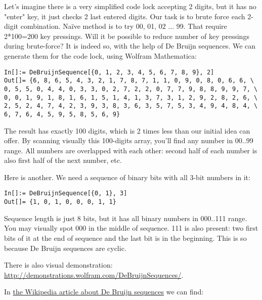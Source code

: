 
\leveldown{}


Let's imagine there is a very simplified code lock accepting 2 digits, but it has no "enter" key, it just checks 2 last entered digits.
Our task is to brute force each 2-digit combination.
Naïve method is to try 00, 01, 02 ... 99.
That require 2*100=200 key pressings.
Will it be possible to reduce number of key pressings during brute-force?
It is indeed so, with the help of De Bruijn sequences.
We can generate them for the code lock, using Wolfram Mathematica:

\begin{lstlisting}
In[]:= DeBruijnSequence[{0, 1, 2, 3, 4, 5, 6, 7, 8, 9}, 2]
Out[]= {6, 8, 6, 5, 4, 3, 2, 1, 7, 8, 7, 1, 1, 0, 9, 0, 8, 0, 6, 6, \
0, 5, 5, 0, 4, 4, 0, 3, 3, 0, 2, 7, 2, 2, 0, 7, 7, 9, 8, 8, 9, 9, 7, \
0, 0, 1, 9, 1, 8, 1, 6, 1, 5, 1, 4, 1, 3, 7, 3, 1, 2, 9, 2, 8, 2, 6, \
2, 5, 2, 4, 7, 4, 2, 3, 9, 3, 8, 3, 6, 3, 5, 7, 5, 3, 4, 9, 4, 8, 4, \
6, 7, 6, 4, 5, 9, 5, 8, 5, 6, 9}
\end{lstlisting}

The result has exactly 100 digits, which is 2 times less than our initial idea can offer.
By scanning visually this 100-digits array, you'll find any number in 00..99 range.
All numbers are overlapped with each other: second half of each number is also first half of the next number, etc.

Here is another. We need a sequence of binary bits with all 3-bit numbers in it:

\begin{lstlisting}
In[]:= DeBruijnSequence[{0, 1}, 3]
Out[]= {1, 0, 1, 0, 0, 0, 1, 1}
\end{lstlisting}

Sequence length is just 8 bits, but it has all binary numbers in 000..111 range.
You may visually spot 000 in the middle of sequence.
111 is also present: two first bits of it at the end of sequence and the last bit is in the beginning.
This is so because De Bruijn sequences are cyclic.

There is also visual demonstration: \url{http://demonstrations.wolfram.com/DeBruijnSequences/}.

\myheading{Trailing zero bits counting}

In \href{https://en.wikipedia.org/wiki/De_Bruijn_sequence}{the Wikipedia article about De Bruijn sequences} we can find:

